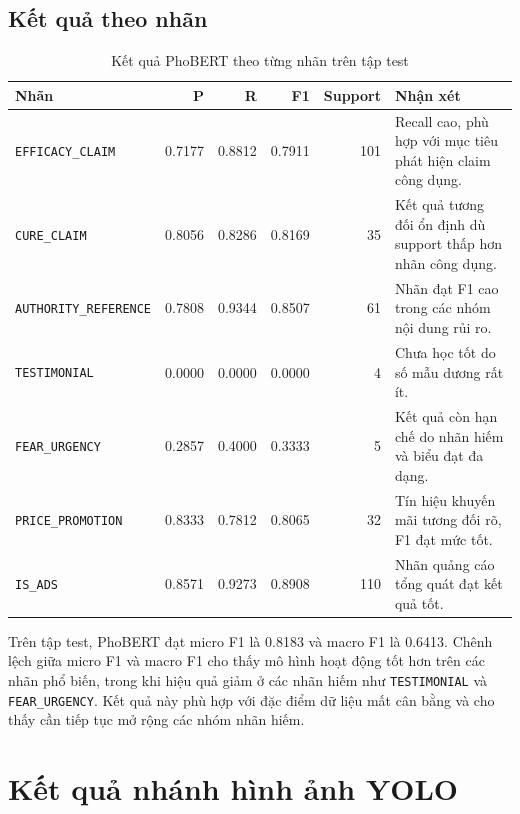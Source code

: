 \subsection{Kết quả theo nhãn}
\begin{table}[H]
\centering
\caption{Kết quả PhoBERT theo từng nhãn trên tập test}
\label{tab:phobert_per_label_results}
\begin{tabularx}{\textwidth}{|L{0.30\textwidth}|r|r|r|r|Y|}
\hline
\textbf{Nhãn} & \textbf{P} & \textbf{R} & \textbf{F1} & \textbf{Support} & \textbf{Nhận xét} \\
\hline
\texttt{EFFICACY\_CLAIM} & 0.7177 & 0.8812 & 0.7911 & 101 & Recall cao, phù hợp với mục tiêu phát hiện claim công dụng. \\ \hline
\texttt{CURE\_CLAIM} & 0.8056 & 0.8286 & 0.8169 & 35 & Kết quả tương đối ổn định dù support thấp hơn nhãn công dụng. \\ \hline
\texttt{AUTHORITY\_REFERENCE} & 0.7808 & 0.9344 & 0.8507 & 61 & Nhãn đạt F1 cao trong các nhóm nội dung rủi ro. \\ \hline
\texttt{TESTIMONIAL} & 0.0000 & 0.0000 & 0.0000 & 4 & Chưa học tốt do số mẫu dương rất ít. \\ \hline
\texttt{FEAR\_URGENCY} & 0.2857 & 0.4000 & 0.3333 & 5 & Kết quả còn hạn chế do nhãn hiếm và biểu đạt đa dạng. \\ \hline
\texttt{PRICE\_PROMOTION} & 0.8333 & 0.7812 & 0.8065 & 32 & Tín hiệu khuyến mãi tương đối rõ, F1 đạt mức tốt. \\ \hline
\texttt{IS\_ADS} & 0.8571 & 0.9273 & 0.8908 & 110 & Nhãn quảng cáo tổng quát đạt kết quả tốt. \\ \hline
\end{tabularx}
\end{table}

Trên tập test, PhoBERT đạt micro F1 là 0.8183 và macro F1 là 0.6413. Chênh lệch giữa micro F1 và macro F1 cho thấy mô hình hoạt động tốt hơn trên các nhãn phổ biến, trong khi hiệu quả giảm ở các nhãn hiếm như \texttt{TESTIMONIAL} và \texttt{FEAR\_URGENCY}. Kết quả này phù hợp với đặc điểm dữ liệu mất cân bằng và cho thấy cần tiếp tục mở rộng các nhóm nhãn hiếm.

\section{Kết quả nhánh hình ảnh YOLO}
